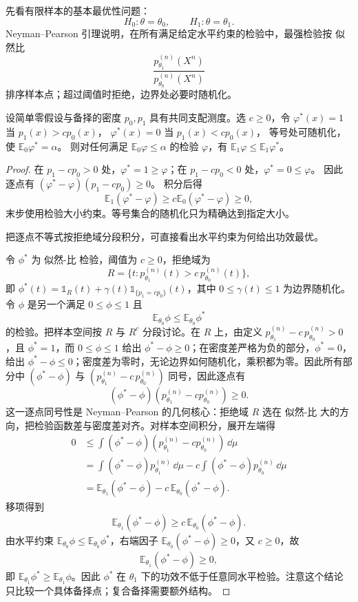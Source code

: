 \begin{theorem}
先看有限样本的基本最优性问题：
\[
 H_0:\theta=\theta_0,
 \qquad
 H_1:\theta=\theta_1.
\]
Neyman--Pearson 引理说明，在所有满足给定水平约束的检验中，最强检验按 似然比
\[
 \frac{p_{\theta_1}^{(n)}(X^n)}{p_{\theta_0}^{(n)}(X^n)}
\]
排序样本点；超过阈值时拒绝，边界处必要时随机化。

设简单零假设与备择的密度 \(p_0,p_1\) 具有共同支配测度。选 \(c\ge0\)，令
\(\varphi^*(x)=1\) 当 \(p_1(x)>cp_0(x)\)，
\(\varphi^*(x)=0\) 当 \(p_1(x)<cp_0(x)\)，
等号处可随机化，使 \(\mathbb E_0\varphi^*=\alpha\)。
则对任何满足 \(\mathbb E_0\varphi\le\alpha\) 的检验 \(\varphi\)，有
\(\mathbb E_1\varphi\le\mathbb E_1\varphi^*\)。
\end{theorem}
\begin{proof}
在 \(p_1-cp_0>0\) 处，\(\varphi^*=1\ge\varphi\)；在
\(p_1-cp_0<0\) 处，\(\varphi^*=0\le\varphi\)。
因此逐点有
\((\varphi^*-\varphi)(p_1-cp_0)\ge0\)。
积分后得
\[
\mathbb E_1(\varphi^*-\varphi)
\ge c\mathbb E_0(\varphi^*-\varphi)
\ge0,
\]
末步使用检验大小约束。等号集合的随机化只为精确达到指定大小。

把逐点不等式按拒绝域分段积分，可直接看出水平约束为何给出功效最优。

令 $\phi^*$ 为 似然-比 检验，阈值为 $c\ge0$，拒绝域为
\[
 R=\{t:p_{\theta_1}^{(n)}(t)>c\,p_{\theta_0}^{(n)}(t)\},
\]
即 $\phi^*(t)=\mathds{1}_R(t)+\gamma(t)\mathds{1}_{\{p_1=cp_0\}}(t)$，其中 $0\le\gamma(t)\le1$ 为边界随机化。令 $\phi$ 是另一个满足 $0\le\phi\le1$ 且
\[
 \mathbb E_{\theta_0}\phi\le\mathbb E_{\theta_0}\phi^*
\]
的检验。把样本空间按 $R$ 与 $R^c$ 分段讨论。在 $R$ 上，由定义 $p_{\theta_1}^{(n)}-c\,p_{\theta_0}^{(n)}>0$，且 $\phi^*=1$，而 $0\le\phi\le1$ 给出 $\phi^*-\phi\ge0$；在密度差严格为负的部分，$\phi^*=0$，给出 $\phi^*-\phi\le0$；密度差为零时，无论边界如何随机化，乘积都为零。因此所有部分中 $(\phi^*-\phi)$ 与 $(p_{\theta_1}^{(n)}-c\,p_{\theta_0}^{(n)})$ 同号，因此逐点有
\[
 (\phi^*-\phi)
 (p_{\theta_1}^{(n)}-cp_{\theta_0}^{(n)})\ge0.
\]
这一逐点同号性是 Neyman--Pearson 的几何核心：拒绝域 $R$ 选在 似然-比 大的方向，把检验函数差与密度差对齐。对样本空间积分，展开左端得
\begin{align*}
0&\le\int(\phi^*-\phi)(p_{\theta_1}^{(n)}-cp_{\theta_0}^{(n)})\,\dd\mu\\
&=\int(\phi^*-\phi)p_{\theta_1}^{(n)}\,\dd\mu
 -c\int(\phi^*-\phi)p_{\theta_0}^{(n)}\,\dd\mu\\
&=\mathbb E_{\theta_1}(\phi^*-\phi)-c\,\mathbb E_{\theta_0}(\phi^*-\phi).
\end{align*}
移项得到
\[
 \mathbb E_{\theta_1}(\phi^*-\phi)
 \ge c\,\mathbb E_{\theta_0}(\phi^*-\phi).
\]
由水平约束 $\mathbb E_{\theta_0}\phi\le\mathbb E_{\theta_0}\phi^*$，右端因子 $\mathbb E_{\theta_0}(\phi^*-\phi)\ge0$，又 $c\ge0$，故
\[
 \mathbb E_{\theta_1}(\phi^*-\phi)\ge0,
\]
即 $\mathbb E_{\theta_1}\phi^*\ge\mathbb E_{\theta_1}\phi$。因此 $\phi^*$ 在 $\theta_1$ 下的功效不低于任意同水平检验。注意这个结论只比较一个具体备择点；复合备择需要额外结构。
\end{proof}

